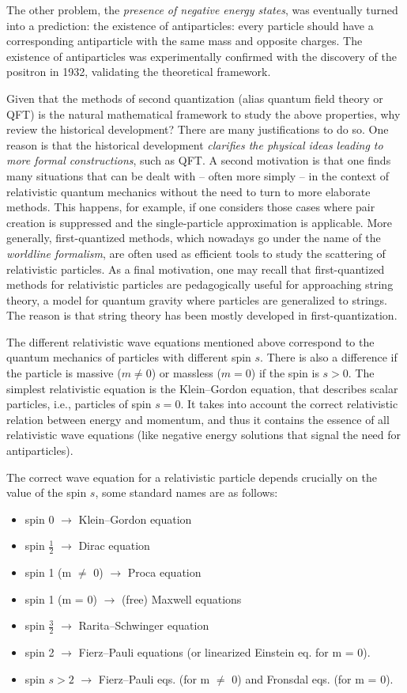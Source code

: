 The other problem, the \textit{presence of negative energy states}, was eventually turned into a prediction: the existence of antiparticles: every particle should have a corresponding antiparticle with the same mass and opposite charges. The existence of antiparticles was experimentally confirmed with the discovery of the positron in 1932, validating the theoretical framework.

Given that the methods of second quantization (alias quantum field theory or QFT) is the natural mathematical framework to study the above properties, why review the historical development? There are many justifications to do so. One reason is that the historical development \textit{clarifies the physical ideas leading to more formal constructions}, such as QFT. A second motivation is that one finds many situations that can be dealt with -- often more simply -- in the context of relativistic quantum mechanics without the need to turn to more elaborate methods. This happens, for example, if one considers those cases where pair creation is suppressed and the single-particle approximation is applicable. More generally, first-quantized methods, which nowadays go under the name of the \textit{worldline formalism}, are often used as efficient tools to study the scattering of relativistic particles. As a final motivation, one may recall that first-quantized methods for relativistic particles are pedagogically useful for approaching string theory, a model for quantum gravity where particles are generalized to strings. The reason is that string theory has been mostly developed in first-quantization.

The different relativistic wave equations mentioned above correspond to the quantum mechanics of particles with different spin \(s\). There is also a difference if the particle is massive (\(m\neq 0\)) or massless (\(m=0\)) if the spin is \(s>0\). The simplest relativistic equation is the Klein--Gordon equation, that describes scalar particles, i.e., particles of spin \(s=0\). It takes into account the correct relativistic relation between energy and momentum, and thus it contains the essence of all relativistic wave equations (like negative energy solutions that signal the need for antiparticles).

The correct wave equation for a relativistic particle depends crucially on the value of the spin \(s\), some standard names are as follows:
\begin{itemize}
    \item spin 0 $\to$ Klein--Gordon equation
    \item spin $\tfrac{1}{2}$ $\to$ Dirac equation
    \item spin 1 (m $\neq$ 0) $\to$ Proca equation
    \item spin 1 (m = 0) $\to$ (free) Maxwell equations
    \item spin $\tfrac{3}{2}$ $\to$ Rarita--Schwinger equation
    \item spin 2 $\to$ Fierz--Pauli equations (or linearized Einstein eq. for m = 0).
    \item spin $s>2$ $\to$ Fierz--Pauli eqs. (for m $\neq$ 0) and Fronsdal eqs. (for m = 0).
\end{itemize}

